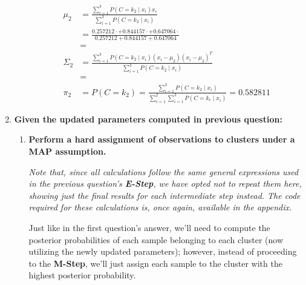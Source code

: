 \documentclass[12pt]{article}
\begin{document}
\begin{enumerate}[leftmargin=\labelsep]
\begin{itemize}[leftmargin=]
                \begin{equation*}
                  \begin{aligned}
                    \mu_2    & = \frac{\sum_{i=1}^3 P(C = k_2 \mid x_i) x_i}{\sum_{i=1}^3 P(C = k_2 \mid x_i)}                                                                                      \\
                             & = \frac{0.257212 \cdot  + 0.844157 \cdot  + 0.647064 \cdot }{0.257212 + 0.844157 + 0.647064} \\
                             & = 
                    \\
                    \Sigma_2 & = \frac{\sum_{i=1}^3 P(C = k_2 \mid x_i) (x_{i} - \mu_{2}) (x_{i} - \mu_{2})^T}{\sum_{i=1}^3 P(C = k_2 \mid x_i)}                                                    \\
                             & = 
                    \\
                    \pi_2    & = P(C = k_2) = \frac{\sum_{i=1}^3 P(C = k_2 \mid x_i)}{\sum_{c=1}^2\sum_{i=1}^3 P(C = k_c \mid x_i)} = 0.582811
                  \end{aligned}
                \end{equation*}

        \end{itemize}

        \pagebreak

  \item \textbf{Given the updated parameters computed in previous question:}

        \begin{enumerate}[leftmargin=\labelsep]
          \item \textbf{Perform a hard assignment of observations to clusters under a MAP assumption.}

                \textit{Note that, since all calculations follow the same general expressions used
                  in the previous question's \textbf{E-Step}, we have opted not to repeat them here,
                  showing just the final results for each intermediate step instead.
                  The code required for these calculations is, once again, available in the
                  appendix.}

                Just like in the first question's answer, we'll need to compute the posterior
                probabilities of each sample belonging to each cluster (now utilizing the newly updated
                parameters); however, instead of proceeding to the \textbf{M-Step}, we'll just assign
                each sample to the cluster with the highest posterior probability.


\end{enumerate}
\end{enumerate}
\end{document}
